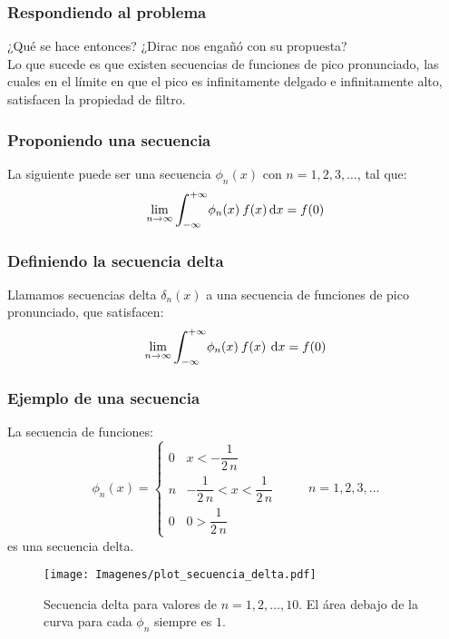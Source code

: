 \documentclass[12pt]{beamer}
\begin{document}
\begin{frame}
\frametitle{Respondiendo al problema}
¿Qué se hace entonces? \pause ¿Dirac nos engañó con su propuesta?
\\
\bigskip
\pause
Lo que sucede es que existen secuencias de funciones de pico pronunciado, las cuales en el límite en que el pico es infinitamente delgado e infinitamente alto, satisfacen la propiedad de filtro.
\end{frame}

\begin{frame}
\frametitle{Proponiendo una secuencia}
La siguiente puede ser una secuencia $\phi_{n} (x)$ con $n = 1, 2, 3, \ldots$, tal que:
\pause
\begin{align*}
\lim_{n \to \infty} \scaleint{6ex}_{\bs -\infty}^{+ \infty} \phi_{n} (x) \: f (x) \dd{x} =  f (0)
\end{align*}
\end{frame}

\begin{frame}
\frametitle{Definiendo la secuencia delta}
Llamamos secuencias delta $\delta_{n} (x)$ a una secuencia de funciones de pico pronunciado, que satisfacen:
\pause
\begin{align*}
\lim_{n \to \infty} \scaleint{6ex}_{\bs -\infty}^{+ \infty} \phi_{n} (x) \: f (x) \: \dd{x} =  f (0)
\end{align*}
\end{frame}

\begin{frame}
\frametitle{Ejemplo de una secuencia}
La secuencia de funciones:
\pause
\begin{equation}
\phi_{n} (x) = \begin{cases}
0 & x < - \dfrac{1}{2 \, n} \\
n & - \dfrac{1}{2 \, n} < x < \dfrac{1}{2 \, n} \\
0 & 0 >  \dfrac{1}{2 \, n}
\end{cases}
\hspace{1cm} n = 1, 2, 3, \ldots
\label{eq:ecuacion_delta_04}
\end{equation}
es una secuencia delta.
\end{frame}

\begin{frame}[plain]
\begin{figure}[H]
    \centering
    \texttt{[image: Imagenes/plot\_secuencia\_delta.pdf]}
    \caption{Secuencia delta para valores de $n = 1, 2, \ldots, 10$. El área debajo de la curva para cada $\phi_{n}$ siempre es $1$.}
    \label{fig:secuncia_delta_01}
\end{figure}
\end{frame}
\end{document}
